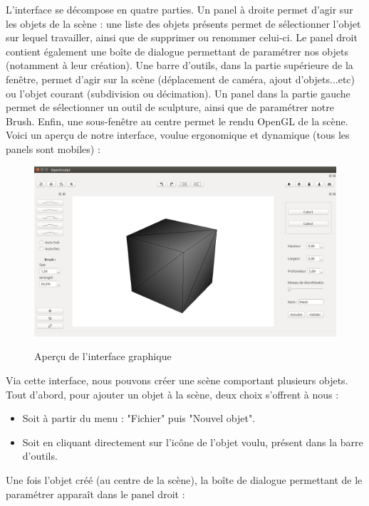 \documentclass[a4paper]{memoir}
\begin{document}
			L'interface se décompose en quatre parties. Un panel à droite permet d'agir sur les objets de la scène : une liste des objets présents permet de 
			sélectionner l'objet sur lequel travailler, ainsi que de supprimer ou renommer celui-ci. Le panel droit contient également une boîte de dialogue 
			permettant de paramétrer nos objets (notamment à leur création). Une barre d'outils, dans la partie supérieure de la fenêtre, permet d'agir 
			sur la scène (déplacement de caméra, ajout d'objets...etc) ou l'objet courant (subdivision ou décimation). Un panel dans la partie gauche permet 
			de sélectionner un outil de sculpture, ainsi que de paramétrer notre Brush. Enfin, une sous-fenêtre au centre permet le rendu OpenGL de la scène.
			\\Voici un aperçu de notre interface, voulue ergonomique et dynamique (tous les panels sont mobiles) :
			\begin{figure}[H]
				\begin{center}
					\includegraphics[scale=0.27]{img/interface.png}
					\label{fig:interface}
					\caption{Aperçu de l'interface graphique}
				\end{center}
			\end{figure}
			Via cette interface, nous pouvons créer une scène comportant plusieurs objets. Tout d'abord, pour ajouter un objet à la scène, deux choix 
			s'offrent à nous :
			\begin{itemize}
				\item Soit à partir du menu : "Fichier" puis  "Nouvel objet".
				\item Soit en cliquant directement sur l'icône de l'objet voulu, présent dans la barre d'outils.
			\end{itemize}
			Une fois l'objet créé (au centre de la scène), la boîte de dialogue permettant de le paramétrer apparaît dans le panel droit :
\end{document}
